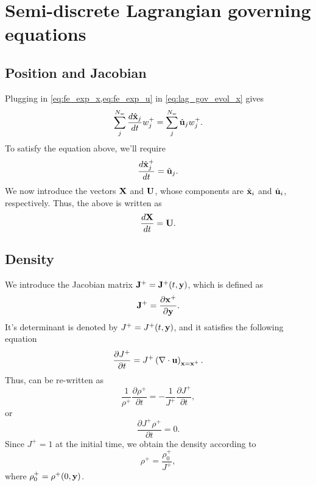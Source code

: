 \documentclass[11pt]{report}
\begin{document}
\section{Semi-discrete Lagrangian governing equations}
\subsection{Position and Jacobian}
Plugging in \cref{eq:fe_exp_x,eq:fe_exp_u} in \cref{eq:lag_gov_evol_x} gives
\begin{equation*}
    \sum_{j}^{N_w} \frac{d \hat{\mathbf{x}}_j}{dt} w^+_j = \sum_{j}^{N_w} \hat{\mathbf{u}}_j w^+_j.
\end{equation*}
To satisfy the equation above, we'll require
\begin{equation*}
    \frac{d \hat{\mathbf{x}}^+_j}{dt} = \hat{\mathbf{u}}_j.
\end{equation*}
We now introduce the vectors $\mathbf{X}$ and $\mathbf{U}$, whose components are $\hat{\mathbf{x}}_i$ and $\hat{\mathbf{u}}_i$, respectively. Thus, the above is written as
\begin{equation}
    \label{eq:evol_x_semi_discrete}
    \frac{d\mathbf{X}}{dt} = \mathbf{U}.
\end{equation}

\subsection{Density}
We introduce the Jacobian matrix $\mathbf{J}^+ = \mathbf{J}^+(t,\mathbf{y})$, which is defined as 
\begin{equation}
    \mathbf{J}^+ =  \frac{\partial \mathbf{x}^+ }{ \partial \mathbf{y}}.
\end{equation}
It's determinant is denoted by $J^+ = J^+(t,\mathbf{y})$, and it satisfies the following equation
\begin{equation}
    \label{eq:evol_det_jacob}
    \frac{\partial J^+}{\partial t} = J^+ \left( \nabla \cdot \mathbf{u} \right)_{\mathbf{x} = \mathbf{x}^+}.
\end{equation}
Thus,  can be re-written as
\begin{equation*}
    \frac{1}{\rho^+} \frac{\partial \rho^+}{\partial t} = -\frac{1}{J^+} \frac{\partial J^+}{\partial t},
\end{equation*}
or
\begin{equation}
    \label{eq:lag_gov_evol_rho_2}
    \frac{\partial J^+ \rho^+}{\partial t} = 0.
\end{equation}
Since $J^+ = 1$ at the initial time, we obtain the density according to
\begin{equation}
    \label{eq:evol_rho_semi_discrete}
    \rho^+ = \frac{\rho^+_0}{J^+},
\end{equation}
where $\rho^+_0 = \rho^+(0,\mathbf{y})$.
\end{document}

